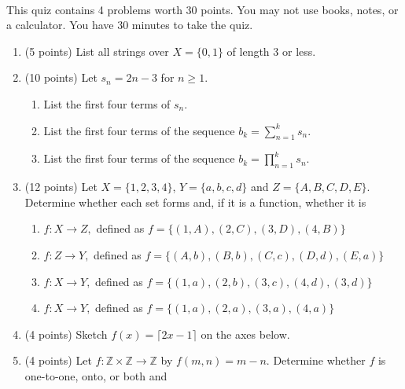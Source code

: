 \documentclass[12pt]{article}
\def\ZZ{{\mathbb Z}}
\newcommand{\be}{\begin{enumerate}}
\newcommand{\ee}{\end{enumerate}}
\begin{document}
\thispagestyle{fancy}


\\

\noindent This quiz contains 4 problems worth 30 points. You may not use books, notes, or a calculator. You have 30 minutes to take the quiz.\\

\noindent \hrulefill
\be
\item (5 points) List all strings over $X=\{0,1\}$ of length 3 or less.
\vfill
\item (10 points) Let $s_{n}=2n-3$ for $n\geq 1.$
\be
\item List the first four terms of $s_n$.
\vfill
\item List the first four terms of the sequence $b_k=\sum_{n=1}^k s_n.$
\vfill
\item List the first four terms of the sequence $b_k=\prod_{n=1}^k s_n.$
\vfill
\ee
\newpage
\item (12 points) Let $X=\{1,2,3,4\}$, $Y=\{a,b,c,d\}$ and $Z=\{A,B,C,D,E\}.$ Determine whether each set forms   and, if it is a function, whether it is  
\be


\item $f: X \to Z,$ defined as  $f=\{(1,A), (2,C), (3,D),(4,B)\}$ \\
\vspace{.3in}


\item $f: Z \to Y,$ defined as  $f=\{(A,b), (B,b), (C,c),(D,d), (E,a)\}$ \\
\vspace{.3in}

\item $f: X \to Y,$ defined as $f=\{(1,a), (2,b), (3,c),(4,d), (3,d)\}$\\




\vspace{.3in}
\item $f: X \to Y,$ defined as  $f=\{(1,a), (2,a), (3,a),(4,a)\}$ \\


\vspace{.3in}
\ee
\item (4  points) Sketch $f(x)=\lceil 2x-1 \rceil$ on the axes below.\\

\item (4  points) Let $f: \ZZ \times \ZZ \to \ZZ$ by $f(m,n)=m-n.$ Determine whether $f$ is one-to-one, onto, or both and 
\ee
\end{document}
